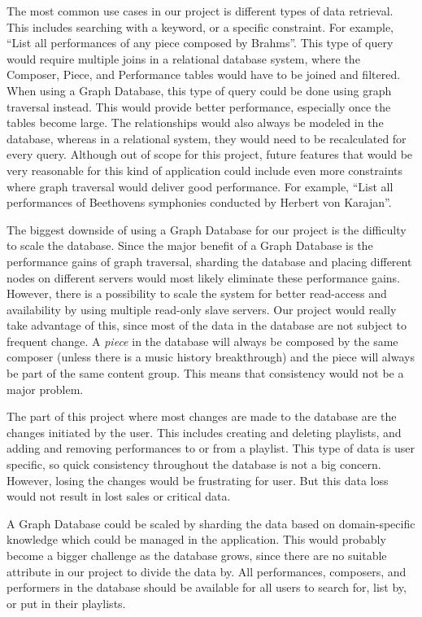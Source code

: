 The most common use cases in our project is different types of data retrieval. This includes searching with a keyword, or a specific constraint. For example, ``List all performances of any piece composed by Brahms''. This type of query would require multiple joins in a relational database system, where the Composer, Piece, and Performance tables would have to be joined and filtered. When using a Graph Database, this type of query could be done using graph traversal instead. This would provide better performance, especially once the tables become large. The relationships would also always be modeled in the database, whereas in a relational system, they would need to be recalculated for every query. Although out of scope for this project, future features that would be very reasonable for this kind of application could include even more constraints where graph traversal would deliver good performance. For example, ``List all performances of Beethovens symphonies conducted by Herbert von Karajan''.

The biggest downside of using a Graph Database for our project is the difficulty to scale the database. Since the major benefit of a Graph Database is the performance gains of graph traversal, sharding the database and placing different nodes on different servers would most likely eliminate these performance gains. However, there is a possibility to scale the system for better read-access and availability by using multiple read-only slave servers. Our project would really take advantage of this, since most of the data in the database are not subject to frequent change. A \emph{piece} in the database will always be composed by the same composer (unless there is a music history breakthrough) and the piece will always be part of the same content group. This means that consistency would not be a major problem.

The part of this project where most changes are made to the database are the changes initiated by the user. This includes creating and deleting playlists, and adding and removing performances to or from a playlist. This type of data is user specific, so quick consistency throughout the database is not a big concern. However, losing the changes would be frustrating for user. But this data loss would not result in lost sales or critical data.

A Graph Database could be scaled by sharding the data based on domain-specific knowledge which could be managed in the application. This would probably become a bigger challenge as the database grows, since there are no suitable attribute in our project to divide the data by. All performances, composers, and performers in the database should be available for all users to search for, list by, or put in their playlists.

